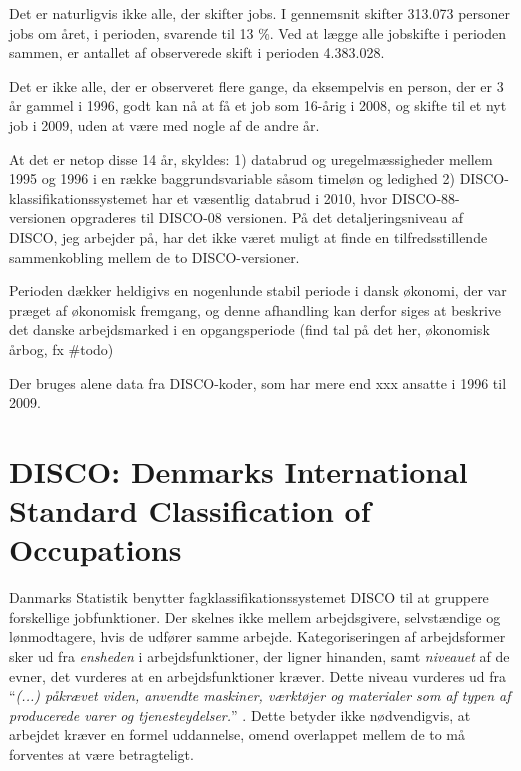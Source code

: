 Det er naturligvis ikke alle, der skifter jobs. I gennemsnit skifter 313.073 personer jobs om året, i perioden, svarende til 13 \%.  Ved at lægge alle jobskifte i perioden sammen, er antallet af observerede skift i perioden 4.383.028. 

Det er ikke alle, der er observeret flere gange, da eksempelvis en person, der er 3 år gammel i 1996, godt kan nå at få et job som 16-årig i 2008, og skifte til et nyt job i 2009, uden at være med nogle af de andre år. 



At det er netop disse 14 år, skyldes: 1) databrud og uregelmæssigheder mellem 1995 og 1996 i en række baggrundsvariable såsom timeløn og ledighed 2) DISCO-klassifikationssystemet har et væsentlig databrud i 2010, hvor DISCO-88-versionen opgraderes til DISCO-08 versionen. På det detaljeringsniveau af DISCO, jeg arbejder på, har det ikke været muligt at finde en tilfredsstillende sammenkobling mellem de to DISCO-versioner.

Perioden dækker heldigivs en nogenlunde stabil periode i dansk økonomi, der var præget af økonomisk fremgang, og denne afhandling kan derfor siges at beskrive det danske arbejdsmarked i en opgangsperiode (find tal på det her, økonomisk årbog, fx \#todo)

Der bruges alene data fra DISCO-koder, som har mere end xxx ansatte i 1996 til 2009. 






\section{DISCO: Denmarks International Standard Classification of Occupations}


Danmarks Statistik benytter fagklassifikationssystemet DISCO til at gruppere forskellige jobfunktioner. Der skelnes ikke mellem arbejdsgivere, selvstændige og lønmodtagere, hvis de udfører samme arbejde. 
Kategoriseringen af arbejdsformer sker ud fra \emph{ensheden} i arbejdsfunktioner, der ligner hinanden, samt \emph{niveauet} af de evner, det vurderes at en arbejdsfunktioner kræver. Dette niveau vurderes ud fra “\emph{(...) påkrævet viden, anvendte maskiner, værktøjer og materialer som af typen af producerede varer og tjenesteydelser.}” \parencite{DST2014b}.  Dette betyder ikke nødvendigvis, at arbejdet kræver en formel uddannelse, omend overlappet mellem de to må forventes at være betragteligt. 

